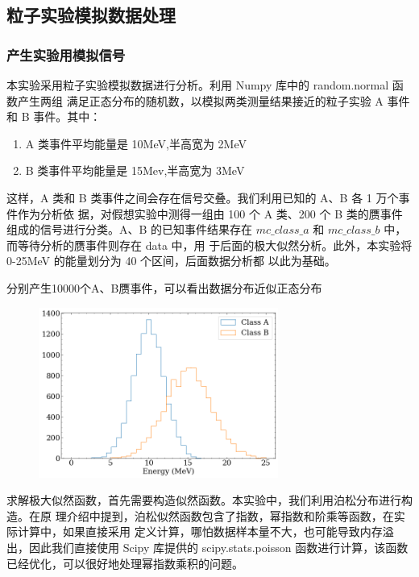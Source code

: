 \documentclass[10pt,a4paper,twoside,UTF8]{ctexart}
\begin{document}
\subsection{粒子实验模拟数据处理}
\subsubsection{产生实验用模拟信号}
本实验采用粒子实验模拟数据进行分析。利用 Numpy 库中的 random.normal 函数产生两组
满足正态分布的随机数，以模拟两类测量结果接近的粒子实验 A 事件和 B 事件。其中：
\begin{enumerate}
	\item A 类事件平均能量是 10MeV,半高宽为 2MeV
	\item B 类事件平均能量是 15Mev,半高宽为 3MeV
\end{enumerate}

这样，A 类和 B 类事件之间会存在信号交叠。我们利用已知的 A、B 各 1 万个事件作为分析依
据，对假想实验中测得一组由 100 个 A 类、200 个 B 类的赝事件组成的信号进行分类。A、B
的已知事件结果存在 $mc\_class\_a$ 和 $mc\_class\_b$ 中，而等待分析的赝事件则存在 data 中，用
于后面的极大似然分析。此外，本实验将 0-25MeV 的能量划分为 40 个区间，后面数据分析都
以此为基础。


分别产生10000个A、B赝事件，可以看出数据分布近似正态分布
\begin{figure}[H]
	\centering
	\includegraphics[width=0.7\textwidth]{img//1.png}
	\label{fig:1}
\end{figure}

求解极大似然函数，首先需要构造似然函数。本实验中，我们利用泊松分布进行构造。在原
理介绍中提到，泊松似然函数包含了指数，幂指数和阶乘等函数，在实际计算中，如果直接采用
定义计算，哪怕数据样本量不大，也可能导致内存溢出，因此我们直接使用 Scipy 库提供的
scipy.stats.poisson 函数进行计算，该函数已经优化，可以很好地处理幂指数乘积的问题。
\end{document}
